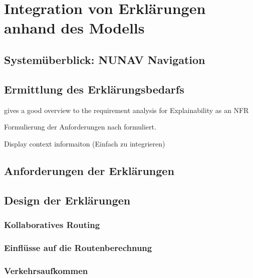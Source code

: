 \section{Integration von Erklärungen anhand des Modells}

\subsection{Systemüberblick: NUNAV Navigation}

\subsection{Ermittlung des Erklärungsbedarfs}

\cite{golledge1999wayfinding}

\cite{bovy2012route}

\cite{kohl_explainability_2019} gives a good overview to the requirement analysis for Explainability as an NFR

Formulierung der Anforderungen nach \cite{rajnish2010quality, wiegers1999writing, alexander2002writing} formuliert.

Display context informaiton (Einfach zu integrieren) \cite{wiegand_id_2020}

\subsection{Anforderungen der Erklärungen}

\subsection{Design der Erklärungen}

\subsubsection{Kollaboratives Routing}
\label{sec:user_count_definition}

\subsubsection{Einflüsse auf die Routenberechnung}
\label{sec:route_explanation_definition}

\subsubsection{Verkehrsaufkommen}
\label{sec:traffic_volume_definition}

